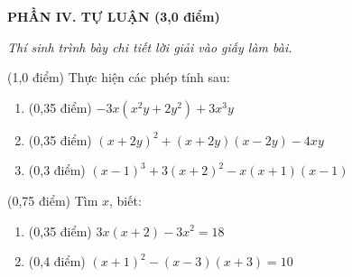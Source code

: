 \documentclass[12pt,a4paper]{article}
\begin{document}
\setcounter{ex}{0}
\noindent\textbf{\large PHẦN IV. TỰ LUẬN (3,0 điểm)}

\textit{Thí sinh trình bày chi tiết lời giải vào giấy làm bài.}

\vspace{1mm}
\begin{ex} (1,0 điểm)
Thực hiện các phép tính sau:
\begin{enumerate}[label=\textbf{\alph*)}, leftmargin=0.8cm, itemsep=2pt]
\item (0,35 điểm) $-3x(x^2y + 2y^2) + 3x^3y$
\item (0,35 điểm) $(x + 2y)^2 + (x + 2y)(x - 2y) - 4xy$
\item (0,3 điểm) $(x - 1)^3 + 3(x + 2)^2 - x(x + 1)(x - 1)$
\end{enumerate}
\end{ex}
\vspace{0.5mm}

\begin{ex} (0,75 điểm)
Tìm $x$, biết:
\begin{enumerate}[label=\textbf{\alph*)}, leftmargin=0.8cm, itemsep=2pt]
\item (0,35 điểm) $3x(x + 2) - 3x^2 = 18$
\item (0,4 điểm) $(x + 1)^2 - (x - 3)(x + 3) = 10$
\end{enumerate}
\end{ex}
\vspace{0.5mm}
\end{document}
